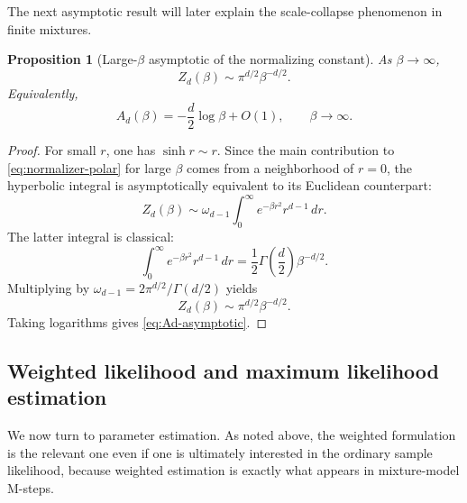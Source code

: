 \documentclass[11pt]{article}
\newtheorem{proposition}[theorem]{Proposition}
\begin{document}
The next asymptotic result will later explain the scale-collapse phenomenon in finite mixtures.

\begin{proposition}[Large-\(\beta\) asymptotic of the normalizing constant]\label{prop:Zd-asymptotic}
As \(\beta\to\infty\),
\begin{equation}\label{eq:Zd-asymptotic}
Z_d(\beta)\sim \pi^{d/2}\beta^{-d/2}.
\end{equation}
Equivalently,
\begin{equation}\label{eq:Ad-asymptotic}
A_d(\beta)=-\frac{d}{2}\log\beta+O(1),
\qquad \beta\to\infty.
\end{equation}
\end{proposition}

\begin{proof}
For small \(r\), one has \(\sinh r\sim r\). Since the main contribution to \eqref{eq:normalizer-polar} for large \(\beta\) comes from a neighborhood of \(r=0\), the hyperbolic integral is asymptotically equivalent to its Euclidean counterpart:
\[
Z_d(\beta)
\sim
\omega_{d-1}\int_0^\infty e^{-\beta r^2}r^{d-1}\,dr.
\]
The latter integral is classical:
\[
\int_0^\infty e^{-\beta r^2}r^{d-1}\,dr
=
\frac{1}{2}\Gamma\!\left(\frac{d}{2}\right)\beta^{-d/2}.
\]
Multiplying by \(\omega_{d-1}=2\pi^{d/2}/\Gamma(d/2)\) yields
\[
Z_d(\beta)\sim \pi^{d/2}\beta^{-d/2}.
\]
Taking logarithms gives \eqref{eq:Ad-asymptotic}.
\end{proof}

\subsection{Weighted likelihood and maximum likelihood estimation}\label{subsec:weighted-mle}

We now turn to parameter estimation. As noted above, the weighted formulation is the relevant one even if one is ultimately interested in the ordinary sample likelihood, because weighted estimation is exactly what appears in mixture-model M-steps.
\end{document}
